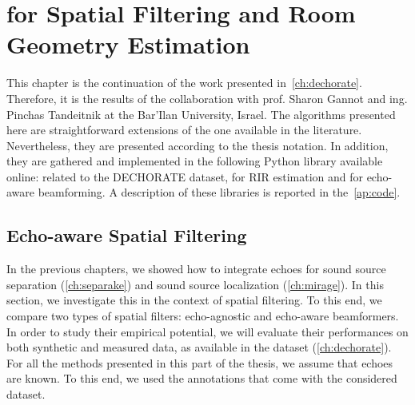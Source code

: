 \chapter{\dEchorate{} for Spatial Filtering and Room Geometry Estimation }\label{ch:dechorateapp}


\vspace{-2.5em}
 \synopsisChDecharateApp



\mynewline
This chapter is the continuation of the work presented in~\cref{ch:dechorate}.
Therefore, it is the results of the collaboration with prof. Sharon Gannot and ing. Pinchas Tandeitnik at the Bar'Ilan University, Israel.
The algorithms presented here are straightforward extensions of the one available in the literature.
Nevertheless, they are presented according to the thesis notation.
In addition, they are  gathered and implemented in the following Python library available online:
 related to the \ac{DECHORATE} dataset,  for \acs{RIR} estimation and  for echo-aware beamforming.
A description of these libraries is reported in the~\cref{ap:code}.

\section{Echo-aware Spatial Filtering}\label{sec:dechorateapp:se}
In the previous chapters, we showed how to integrate echoes for sound source separation (\cref{ch:separake}) and sound source localization (\cref{ch:mirage}).
In this section, we investigate this in the context of spatial filtering.
To this end, we compare two types of spatial filters: echo-agnostic and echo-aware beamformers.
In order to study their empirical potential, we will evaluate their performances on both synthetic and measured data, as available in the \dEchorate{} dataset (\cref{ch:dechorate}).
For all the methods presented in this part of the thesis, we assume that echoes are known.
To this end, we used the annotations that come with the considered dataset.

